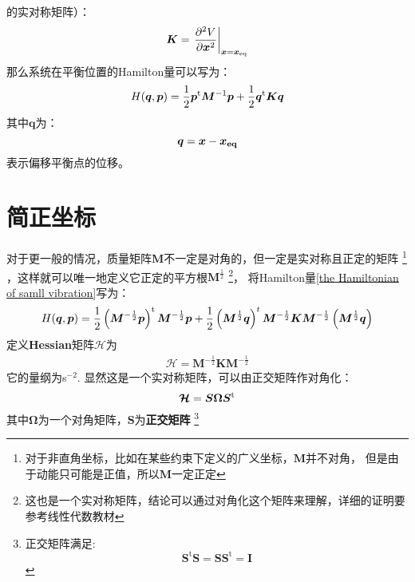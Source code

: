     的实对称矩阵）：
    \begin{equation}
        \bm{K} = \left.\frac{\partial{^2V}}{\partial{\bm{x}^2}}\right|_{\bm{x} = \bm{x}_{\mathrm{eq}}}
        \label{potential matrix}
    \end{equation}
    那么系统在平衡位置的Hamilton量可以写为：
    \begin{equation}
        H(\bm{q}, \bm{p}) = \frac{1}{2}\bm{p}^{\mathrm{t}}\bm{M}^{-1}\bm{p} + \frac{1}{2}\bm{q}^{\mathrm{t}}\bm{K}\bm{q}
        \label{the Hamiltonian of samll vibration}
    \end{equation}
    其中$\bm{q}$为：
    \begin{equation}
        \bm{q} = \bm{x} - \bm{x_{\mathrm{eq}}}
    \end{equation}
    表示偏移平衡点的位移。

    \section{简正坐标}
    对于更一般的情况，质量矩阵$\bm{M}$不一定是对角的，但一定是实对称且正定的矩阵
    \footnote{对于非直角坐标，比如在某些约束下定义的广义坐标，$\bm{M}$并不对角，
    但是由于动能只可能是正值，所以$\bm{M}$一定正定}
    ，这样就可以唯一地定义它正定的平方根$\bm{M}^{\frac{1}{2}}$
    \footnote{这也是一个实对称矩阵，结论可以通过对角化这个矩阵来理解，详细的证明要参考线性代数教材}，
    将Hamilton量\ref{the Hamiltonian of samll vibration}写为：
    \begin{equation}
        H(\bm{q},\bm{p}) = \frac{1}{2}\left(\bm{M}^{-\frac{1}{2}}\bm{p}\right)^{\mathrm{t}}\bm{M}^{-\frac{1}{2}}\bm{p} + 
        \frac{1}{2}\left(\bm{M}^{\frac{1}{2}}\bm{q}\right)^{t}\bm{M}^{-\frac{1}{2}}\bm{K}\bm{M}^{-\frac{1}{2}}\left(\bm{M}^{\frac{1}{2}}\bm{q}\right)
    \end{equation}
    定义\textbf{Hessian}矩阵$\bm{\mathcal{H}}$为 
    \begin{equation}
        \begin{split}
            \bm{\mathcal{H}} = \bm{M}^{-\frac{1}{2}}\bm{K}\bm{M}^{-\frac{1}{2}}
        \end{split}
        \label{Hessian matrix}
    \end{equation}
    它的量纲为s$^{-2}$. 显然这是一个实对称矩阵，可以由正交矩阵作对角化：
    \begin{equation}
        \bm{\mathcal{H}} = \bm{S}\bm{\bm{\Omega}S}^{\mathrm{t}}
    \end{equation}
    其中$\bm{\Omega}$为一个对角矩阵，$\bm{S}$为\textbf{正交矩阵}
    \footnote{
        正交矩阵满足: 
    \begin{equation}
        \bm{S}^\mathrm{t}\bm{S} = \bm{SS}^\mathrm{t} = \bm{I}
    \end{equation}
    }

